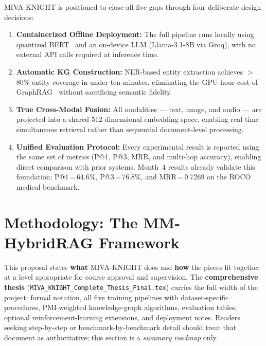 \documentclass[12pt, a4paper]{article}
\begin{document}
MIVA-KNIGHT is positioned to close all five gaps through four deliberate design
decisions:

\begin{enumerate}[leftmargin=1.5em]
  \item \textbf{Containerized Offline Deployment:} The full pipeline runs
    locally using quantized BERT~\cite{devlin2019bert} and an on-device LLM
    (Llama-3.1-8B via Groq), with no external API calls required at inference
    time.

  \item \textbf{Automatic KG Construction:} NER-based entity extraction
    achieves $>$80\% entity coverage in under ten minutes, eliminating the
    GPU-hour cost of GraphRAG~\cite{edge2024graphrag} without sacrificing
    semantic fidelity.

  \item \textbf{True Cross-Modal Fusion:} All modalities --- text, image, and
    audio --- are projected into a shared 512-dimensional embedding space,
    enabling real-time simultaneous retrieval rather than sequential
    document-level processing.

  \item \textbf{Unified Evaluation Protocol:} Every experimental result is
    reported using the same set of metrics (P@1, P@3, MRR, and multi-hop
    accuracy), enabling direct comparison with prior systems. Month~4 results
    already validate this foundation: P@1\,=\,64.6\%, P@3\,=\,76.8\%, and
    MRR\,=\,0.7269 on the ROCO medical benchmark.
\end{enumerate}

\section{Methodology: The MM-HybridRAG Framework}

This proposal states \textbf{what} MIVA-KNIGHT does and \textbf{how} the pieces
fit together at a level appropriate for course approval and supervision. The
\textbf{comprehensive thesis} (\texttt{MIVA\_KNIGHT\_Complete\_Thesis\_Final.tex})
carries the full width of the project: formal notation, all five training
pipelines with dataset-specific procedures, PMI-weighted knowledge-graph
algorithms, evaluation tables, optional reinforcement-learning extensions, and
deployment notes. Readers seeking step-by-step or benchmark-by-benchmark detail
should treat that document as authoritative; this section is a \emph{summary
roadmap} only.
\end{document}
